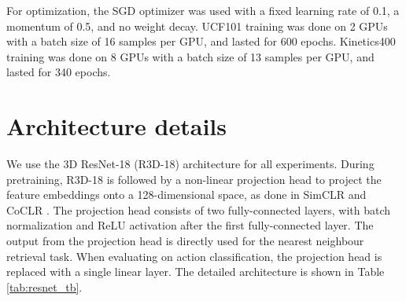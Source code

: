 \documentclass[10pt,twocolumn,letterpaper]{article}
\begin{document}
For optimization, the SGD optimizer was used with a fixed learning rate of 0.1, a momentum of 0.5, and no weight decay. UCF101 training was done on 2 GPUs with a batch size of 16 samples per GPU, and lasted for 600 epochs. Kinetics400 training was done on 8 GPUs with a batch size of 13 samples per GPU, and lasted for 340 epochs.

\section{Architecture details}
\label{architecture_details}
We use the 3D ResNet-18 (R3D-18) architecture \cite{hara2018spatiotemporal} for all experiments. During pretraining, R3D-18 is followed by a non-linear projection head to project the feature embeddings onto a 128-dimensional space, as done in SimCLR \cite{chen2020simple} and CoCLR \cite{coclr}. The projection head consists of two fully-connected layers, with batch normalization and ReLU activation after the first fully-connected layer. The output from the projection head is directly used for the nearest neighbour retrieval task. When evaluating on action classification, the projection head is replaced with a single linear layer. The detailed architecture is shown in Table \ref{tab:resnet_tb}.
\end{document}
